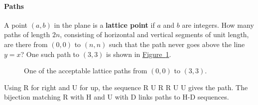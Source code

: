 \documentclass[10pt,]{book}
\newcommand{\terminology}[1]{\textbf{#1}}
\theoremstyle{plain}
\theoremstyle{definition}
\theoremstyle{definition}
\theoremstyle{definition}
\theoremstyle{definition}
\numberwithin{equation}{chapter}
\begin{document}
\paragraph[{Paths}]{Paths}\hypertarget{paragraphs-9}{}
\hypertarget{p-792}{}%
A point \((a, b)\) in the plane is a \terminology{lattice point} if \(a\) and \(b\) are integers. How many paths of length \(2n\), consisting of horizontal and vertical segments of unit length, are there from \((0, 0)\) to \((n, n)\) such that the path never goes above the line \(y = x\)? One such path to \((3, 3)\) is shown in \hyperref[catalanpathex]{Figure~\ref{catalanpathex}}.%
\begin{figure}
\centering
{
}
\caption{One of the acceptable lattice paths from \((0,0)\) to \((3,3)\).\label{catalanpathex}}
\end{figure}
\hypertarget{p-793}{}%
Using R for right and U for up, the sequence R U R R U U gives the path. The bijection matching R with H and U with D links paths to H-D sequences.%
\typeout{************************************************}
\typeout{************************************************}
\end{document}

